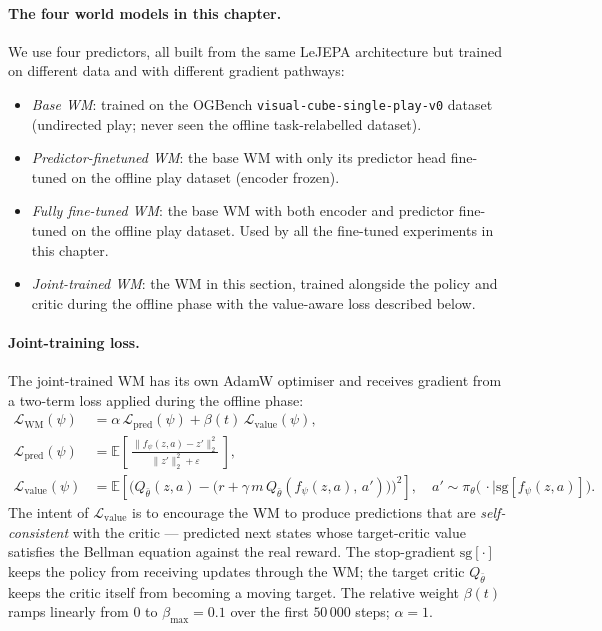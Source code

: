 \paragraph{The four world models in this chapter.}
We use four predictors, all built from the same LeJEPA architecture
but trained on different data and with different gradient pathways:
\begin{itemize}
    \item \emph{Base WM}: trained on the OGBench
    \texttt{visual-cube-single-play-v0} dataset (undirected play; never
    seen the offline task-relabelled dataset).
    \item \emph{Predictor-finetuned WM}: the base WM with only its
    predictor head fine-tuned on the offline play dataset (encoder
    frozen).
    \item \emph{Fully fine-tuned WM}: the base WM with both encoder and
    predictor fine-tuned on the offline play dataset. Used by all the
    fine-tuned experiments in this chapter.
    \item \emph{Joint-trained WM}: the WM in this section, trained
    alongside the policy and critic during the offline phase with the
    value-aware loss described below.
\end{itemize}

\paragraph{Joint-training loss.}
The joint-trained WM has its own AdamW optimiser and receives gradient
from a two-term loss applied during the offline phase:
\begin{align}
    \mathcal{L}_{\text{WM}}(\psi) &= \alpha\,\mathcal{L}_{\text{pred}}(\psi) + \beta(t)\,\mathcal{L}_{\text{value}}(\psi),
    \label{eq:owm-joint}\\
    \mathcal{L}_{\text{pred}}(\psi) &= \mathbb{E}\!\left[\,
        \tfrac{\|f_\psi(z, a) - z'\|_2^2}{\|z'\|_2^2 + \varepsilon}\,\right],
    \label{eq:owm-pred}\\
    \mathcal{L}_{\text{value}}(\psi) &= \mathbb{E}\!\left[\Big(
        Q_{\bar\theta}(z, a) - \big(r + \gamma\, m\, Q_{\bar\theta}(f_\psi(z, a),\, a')\big)\Big)^2\right],
    \quad a' \sim \pi_\theta\big(\,\cdot\mid \mathrm{sg}[f_\psi(z, a)]\big).
    \label{eq:owm-value}
\end{align}
The intent of $\mathcal{L}_{\text{value}}$ is to encourage the WM to
produce predictions that are \emph{self-consistent} with the critic
--- predicted next states whose target-critic value satisfies the
Bellman equation against the real reward. The stop-gradient
$\mathrm{sg}[\cdot]$ keeps the policy from receiving updates through
the WM; the target critic $Q_{\bar\theta}$ keeps the critic itself from
becoming a moving target. The relative weight $\beta(t)$ ramps linearly
from $0$ to $\beta_{\max} = 0.1$ over the first $50\,000$ steps;
$\alpha = 1$.

